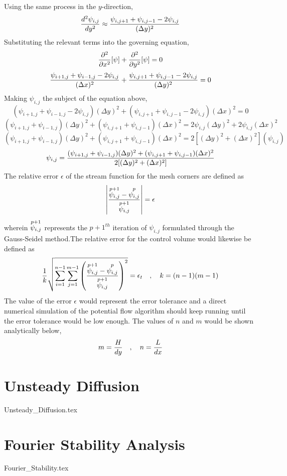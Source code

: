 \documentclass[class=report, 12pt, crop=false]{standalone}
\begin{document}
\begin{center}
Using the same process in the $y$-direction,
$$\frac{d^2\psi_{i,j}}{dy^2} \approx \frac{\psi_{i,j + 1} + \psi_{i,j - 1} - 2\psi_{i,j}}{(\Delta y)^2}$$
Substituting the relevant terms into the governing equation,
$$\frac{\partial^2}{\partial x^2}[\psi] + \frac{\partial^2}{\partial y^2}[\psi] = 0$$
$$\frac{\psi_{i + 1,j} + \psi_{i - 1,j} - 2\psi_{i,j}}{(\Delta x)^2} + \frac{\psi_{i,j + 1} + \psi_{i,j - 1} - 2\psi_{i,j}}{(\Delta y)^2} = 0$$
Making $\psi_{i,j}$ the subject of the equation above,
$$(\psi_{i + 1,j} + \psi_{i - 1,j} - 2\psi_{i,j})(\Delta y)^2 + (\psi_{i,j + 1} + \psi_{i,j - 1} - 2\psi_{i,j})(\Delta x)^2 = 0$$
$$(\psi_{i + 1,j} + \psi_{i - 1,j})(\Delta y)^2 + (\psi_{i,j + 1} + \psi_{i,j - 1})(\Delta x)^2 = 2\psi_{i,j}(\Delta y)^2 + 2\psi_{i,j}(\Delta x)^2$$
$$(\psi_{i + 1,j} + \psi_{i - 1,j})(\Delta y)^2 + (\psi_{i,j + 1} + \psi_{i,j - 1})(\Delta x)^2 = 2[(\Delta y)^2 + (\Delta x)^2](\psi_{i,j})$$
$$\psi_{i,j} = \frac{(\psi_{i + 1,j} + \psi_{i - 1,j})(\Delta y)^2 + (\psi_{i,j + 1} + \psi_{i,j - 1})(\Delta x)^2}{2[(\Delta y)^2 + (\Delta x)^2]}$$
The relative error $\epsilon$ of the stream function for the mesh corners are defined as
$$\left|\frac{\overset{p+1}{\psi_{i,j}} - \overset{p}{\psi_{i,j}}}{\overset{p+1}{\psi_{i,j}}}\right| = \epsilon$$
wherein $\displaystyle{\overset{p+1}{\psi_{i,j}}}$ represents the $p+1^{th}$ iteration of $\psi_{i,j}$ formulated through the Gauss-Seidel method.The relative error for the control volume would likewise be defined as
$$\frac{1}{k}\sqrt{\sum^{n-1}_{i = 1}\sum^{m-1}_{j = 1}\left(\frac{\overset{p+1}{\psi_{i,j}} - \overset{p}{\psi_{i,j}}}{\overset{p+1}{\psi_{i,j}}}\right)^2} = \epsilon_{t}\quad,\quad k = (n-1)(m-1)$$
The value of the error $\epsilon$ would represent the error tolerance and a direct numerical simulation of the potential flow algorithm should keep running until the error tolerance would be low enough. The values of $n$ and $m$ would be shown analytically below,
$$m = \frac{H}{dy}\quad,\quad n = \frac{L}{dx}$$
\section{Unsteady Diffusion}
\begin{comment}
\end{comment}
{Unsteady_Diffusion.tex}
\section{Fourier Stability Analysis}
\begin{comment}
\end{comment}
{Fourier_Stability.tex}



\end{center}
\end{document}
